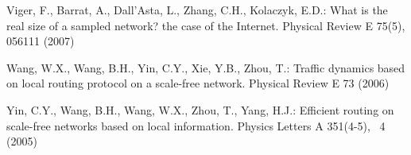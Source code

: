 \documentclass[a4paper]{llncs}
\begin{document}
\begin{thebibliography}{10}
Viger, F., Barrat, A., {Dall'Asta}, L., Zhang, C.H., Kolaczyk, E.D.: What is
  the real size of a sampled network? the case of the \uppercase{I}nternet.
  Physical Review E  75(5),  056111 (2007)

Wang, W.X., Wang, B.H., Yin, C.Y., Xie, Y.B., Zhou, T.: Traffic dynamics based
  on local routing protocol on a scale-free network. Physical Review E  73
  (2006)

Yin, C.Y., Wang, B.H., Wang, W.X., Zhou, T., Yang, H.J.: Efficient routing on
  scale-free networks based on local information. Physics Letters A  351(4-5),
  ~4 (2005)

\end{thebibliography}
\end{document}
